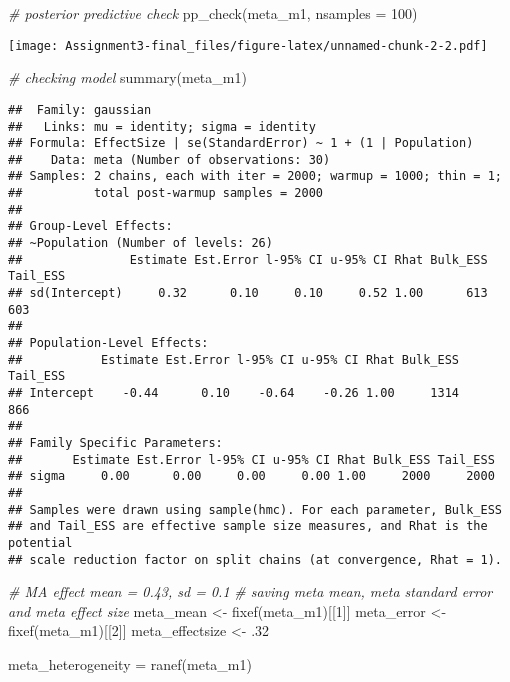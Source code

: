 \documentclass[
]{article}
\newenvironment{Shaded}{\begin{snugshade}}{\end{snugshade}}
\newcommand{\AttributeTok}[1]{\textcolor[rgb]{0.77,0.63,0.00}{#1}}
\newcommand{\CommentTok}[1]{\textcolor[rgb]{0.56,0.35,0.01}{\textit{#1}}}
\newcommand{\DecValTok}[1]{\textcolor[rgb]{0.00,0.00,0.81}{#1}}
\newcommand{\FunctionTok}[1]{\textcolor[rgb]{0.00,0.00,0.00}{#1}}
\newcommand{\NormalTok}[1]{#1}
\newcommand{\OtherTok}[1]{\textcolor[rgb]{0.56,0.35,0.01}{#1}}
\begin{document}
\begin{Shaded}
\begin{Highlighting}[]
\CommentTok{\# posterior predictive check}
\FunctionTok{pp\_check}\NormalTok{(meta\_m1, }\AttributeTok{nsamples =} \DecValTok{100}\NormalTok{)}
\end{Highlighting}
\end{Shaded}

\texttt{[image: Assignment3-final\_files/figure-latex/unnamed-chunk-2-2.pdf]}

\begin{Shaded}
\begin{Highlighting}[]
\CommentTok{\# checking model}
\FunctionTok{summary}\NormalTok{(meta\_m1)}
\end{Highlighting}
\end{Shaded}

\begin{verbatim}
##  Family: gaussian 
##   Links: mu = identity; sigma = identity 
## Formula: EffectSize | se(StandardError) ~ 1 + (1 | Population) 
##    Data: meta (Number of observations: 30) 
## Samples: 2 chains, each with iter = 2000; warmup = 1000; thin = 1;
##          total post-warmup samples = 2000
## 
## Group-Level Effects: 
## ~Population (Number of levels: 26) 
##               Estimate Est.Error l-95% CI u-95% CI Rhat Bulk_ESS Tail_ESS
## sd(Intercept)     0.32      0.10     0.10     0.52 1.00      613      603
## 
## Population-Level Effects: 
##           Estimate Est.Error l-95% CI u-95% CI Rhat Bulk_ESS Tail_ESS
## Intercept    -0.44      0.10    -0.64    -0.26 1.00     1314      866
## 
## Family Specific Parameters: 
##       Estimate Est.Error l-95% CI u-95% CI Rhat Bulk_ESS Tail_ESS
## sigma     0.00      0.00     0.00     0.00 1.00     2000     2000
## 
## Samples were drawn using sample(hmc). For each parameter, Bulk_ESS
## and Tail_ESS are effective sample size measures, and Rhat is the potential
## scale reduction factor on split chains (at convergence, Rhat = 1).
\end{verbatim}

\begin{Shaded}
\begin{Highlighting}[]
\CommentTok{\# MA effect mean = 0.43, sd = 0.1}
\CommentTok{\# saving meta mean, meta standard error and meta effect size}
\NormalTok{meta\_mean }\OtherTok{\textless{}{-}} \FunctionTok{fixef}\NormalTok{(meta\_m1)[[}\DecValTok{1}\NormalTok{]]}
\NormalTok{meta\_error }\OtherTok{\textless{}{-}} \FunctionTok{fixef}\NormalTok{(meta\_m1)[[}\DecValTok{2}\NormalTok{]]}
\NormalTok{meta\_effectsize }\OtherTok{\textless{}{-}}\NormalTok{ .}\DecValTok{32}

\NormalTok{meta\_heterogeneity }\OtherTok{=} \FunctionTok{ranef}\NormalTok{(meta\_m1)}
\end{Highlighting}
\end{Shaded}
\end{document}
